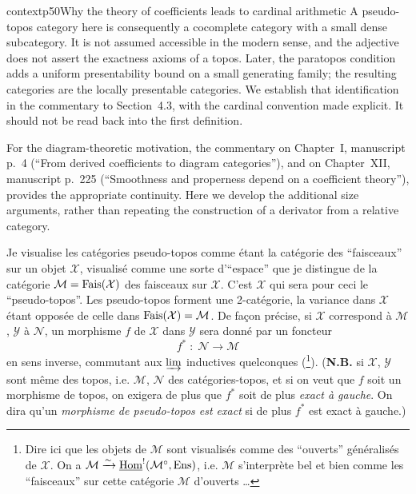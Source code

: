 \begin{dcomment}{context}{p50}{Why the theory of coefficients leads to cardinal arithmetic}
A pseudo-topos category here is consequently a cocomplete category with a small dense subcategory. It is not assumed accessible in the modern sense, and the adjective does not assert the exactness axioms of a topos. Later, the paratopos condition adds a uniform presentability bound on a small generating family; the resulting categories are the locally presentable categories. We establish that identification in the commentary to Section~4.3, with the cardinal convention made explicit. It should not be read back into the first definition.

For the diagram-theoretic motivation, the commentary on Chapter~I, manuscript p.~4 (``From derived coefficients to diagram categories''), and on Chapter~XII, manuscript p.~225 (``Smoothness and properness depend on a coefficient theory''), provides the appropriate continuity. Here we develop the additional size arguments, rather than repeating the construction of a derivator from a relative category.
\end{dcomment}


Je visualise les catégories pseudo-topos comme étant la catégorie des “faisceaux” sur un objet $\mathcal{X}$, visualisé comme une sorte d'“espace” que je distingue de la catégorie $\mathcal{M}=\mathrm{Fais}(\mathcal{X})$ des faisceaux sur $\mathcal{X}$. C'est $\mathcal{X}$ qui sera pour ceci le “pseudo-topos”. Les pseudo-topos forment une 2-catégorie, la variance dans $\mathcal{X}$ étant opposée de celle dans $\mathrm{Fais}(\mathcal{X})=\mathcal{M}$. De façon précise, si $\mathcal{X}$ correspond à $\mathcal{M}$, $\mathcal{Y}$ à $\mathcal{N}$, un morphisme $f$ de $\mathcal{X}$ dans $\mathcal{Y}$ sera donné par un foncteur
\[
f^* \;:\; \mathcal{N} \longrightarrow \mathcal{M}
\tag*{(4.1.1)}
\]
en sens inverse, commutant aux $\varinjlim$ inductives quelconques (\footnote{Dire ici que les objets de $\mathcal{M}$ sont visualisés comme des “ouverts” généralisés de $\mathcal{X}$. On a $\mathcal{M}\xrightarrow{\sim}\underline{\mathrm{Hom}}^!(\mathcal{M}^\circ,\mathrm{Ens})$, i.e. $\mathcal{M}$ s'interprète bel et bien comme les “faisceaux” sur cette catégorie $\mathcal{M}$ d'ouverts \ldots}). (\textbf{N.B.} si $\mathcal{X}$, $\mathcal{Y}$ sont même des topos, i.e. $\mathcal{M}$, $\mathcal{N}$ des catégories-topos, et si on veut que $f$ soit un morphisme de topos, on exigera de plus que $f^*$ soit de plus \textit{exact à gauche}. On dira qu'un \textit{morphisme de pseudo-topos est exact} si de plus $f^*$ est exact à gauche.)

